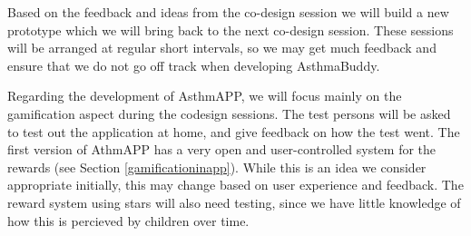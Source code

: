 Based on the feedback and ideas from the co-design session we will build a new prototype which we will bring back to the next co-design session. These sessions will be arranged at regular short intervals, so we may get much feedback and ensure that we do not go off track when developing AsthmaBuddy.

Regarding the development of AsthmAPP, we will focus mainly on the gamification aspect during the codesign sessions. The test persons will be asked to test out the application at home, and give feedback on how the test went. The first version of AthmAPP has a very open and user-controlled system for the rewards (see Section \ref{gamificationinapp}). While this is an idea we consider appropriate initially, this may change based on user experience and feedback. The reward system using stars will also need testing, since we have little knowledge of how this is percieved by children over time.
